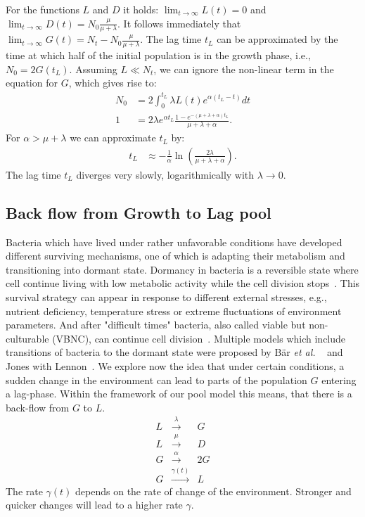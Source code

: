 \documentclass[10pt,twocolumn,5p]{elsarticle}
\numberwithin{equation}{section}
\newcommand{\etal}{{\textit{et al. }}}
\begin{document}
For the functions $L$ and $D$ it holds: $\lim_{t\to\infty} L(t) = 0$ and  $\lim_{t\to\infty} D(t) =  N_0\frac{\mu}{\mu+\lambda} $.
It follows immediately that $\lim_{t\to\infty} G(t) = N_t-N_0\frac{\mu}{\mu+\lambda} $. The lag time $t_L$ can be approximated by the time at which half of the initial population is in the growth phase, i.e., $N_0=2G(t_L)$.
Assuming $L\ll N_t$, we can ignore the non-linear term in the equation for $G$, which gives rise to:
\begin{align}
    N_0&= 2\int_0^{t_L} \lambda L(t)e^{\alpha(t_L-t)}dt\\
    1  &= 2\lambda e^{\alpha t_L}\frac{1-e^{-(\mu+\lambda+\alpha)t_L}}{\mu+\lambda+\alpha}.
\end{align}
For $\alpha > \mu+\lambda$  we can approximate $t_L$ by:
\begin{align}
    t_L &\approx -\frac{1}{\alpha}\ln\left(\frac{2\lambda}{\mu+\lambda+\alpha}\right).
\end{align}
The lag time $t_L$ diverges very slowly, logarithmically with $\lambda\to 0$.
%
%
\subsection{Back flow from Growth to Lag pool}
Bacteria which have lived under rather unfavorable conditions have developed different surviving mechanisms, one of which is adapting their metabolism and transitioning into dormant state.
Dormancy in bacteria is a reversible state where cell continue living with low metabolic activity while the cell division stops~\cite{kaprelyants_dormancy_1993}.
This survival strategy can appear in response to different external stresses, e.g., nutrient deficiency, temperature stress or extreme fluctuations of environment parameters.
And after "difficult times" bacteria, also called viable but non-culturable (VBNC), can continue cell division~\cite{kell_viability_1998}.
Multiple models which include transitions of bacteria to the dormant state were proposed by Bär \etal~\cite{bar_modelling_2002} and Jones with Lennon~\cite{jones_dormancy_2010}.
%
We explore now the idea that under certain conditions, a sudden change in the environment can lead to parts of the population $G$ entering a lag-phase.
Within the framework of our pool model this means, that there is a back-flow from $G$ to $L$.
\begin{eqnarray}
    L &\stackrel{\lambda}{\longrightarrow} & G\\
    L &\stackrel{\mu}{\longrightarrow} & D\\
    G &\stackrel{\alpha}{\longrightarrow} & 2G\\
    G &\stackrel{\gamma(t)}{\longrightarrow} & L
\end{eqnarray}
The rate $\gamma(t)$ depends on the rate of change of the environment.
Stronger and quicker changes will lead to a higher rate $\gamma$.
%
%
\end{document}
